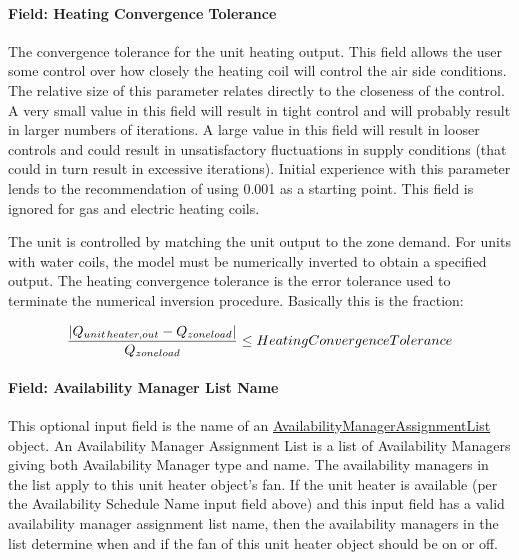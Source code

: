 \paragraph{Field: Heating Convergence Tolerance}\label{field-heating-convergence-tolerance-2}

The convergence tolerance for the unit heating output. This field allows the user some control over how closely the heating coil will control the air side conditions. The relative size of this parameter relates directly to the closeness of the control. A very small value in this field will result in tight control and will probably result in larger numbers of iterations. A large value in this field will result in looser controls and could result in unsatisfactory fluctuations in supply conditions (that could in turn result in excessive iterations). Initial experience with this parameter lends to the recommendation of using 0.001 as a starting point. This field is ignored for gas and electric heating coils.

The unit is controlled by matching the unit output to the zone demand. For units with water coils, the model must be numerically inverted to obtain a specified output. The heating convergence tolerance is the error tolerance used to terminate the numerical inversion procedure. Basically this is the fraction:

\begin{equation}
\frac{{\left| {{Q_{unit{\kern 1pt} heater,out}} - {Q_{zoneload}}} \right|}}{{{Q_{zoneload}}}} \le HeatingConvergenceTolerance
\end{equation}

\paragraph{Field: Availability Manager List Name}\label{field-availability-manager-list-name-2}

This optional input field is the name of an \hyperref[availabilitymanagerassignmentlist]{AvailabilityManagerAssignmentList} object. An Availability Manager Assignment List is a list of Availability Managers giving both Availability Manager type and name. The availability managers in the list apply to this unit heater object's fan. If the unit heater is available (per the Availability Schedule Name input field above) and this input field has a valid availability manager assignment list name, then the availability managers in the list determine when and if the fan of this unit heater object should be on or off.

